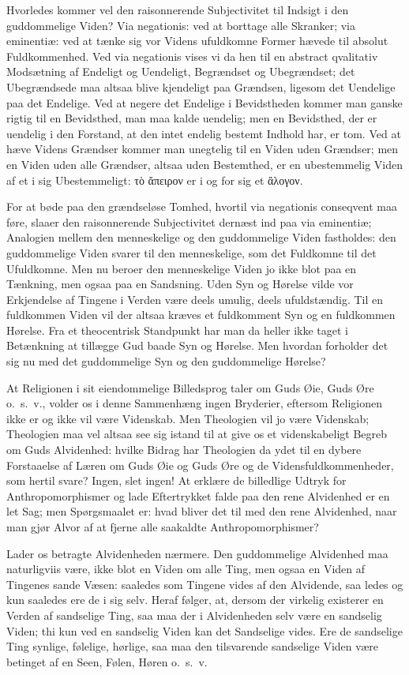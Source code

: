 \documentclass[12pt]{book}
\newcommand{\opage}[1]{\marginnote{\footnotesize\textit{[#1]}}}
\begin{document}
Hvorledes kommer vel den raisonnerende Subjectivitet til Indsigt i den
guddommelige Viden? Via negationis: ved at borttage alle Skranker; via eminentiæ:
ved at tænke sig vor Videns ufuldkomne Former hævede til absolut Fuldkommenhed.
Ved via negationis vises vi da hen til en abstract qvalitativ Modsætning af
Endeligt og Uendeligt, Begrændset og Ubegrændset; det Ubegrændsede maa altsaa
blive kjendeligt paa Grændsen, ligesom det Uendelige paa det Endelige. Ved at
negere det Endelige i Bevidstheden kommer man ganske rigtig til en Bevidsthed,
man maa kalde uendelig; men en Bevidsthed, der er uendelig i den Forstand, at den
intet endelig bestemt Indhold har, er tom. Ved at hæve Videns Grændser kommer man
unegtelig til en Viden uden Grændser; men en Viden uden alle Grændser, altsaa
uden Bestemthed,
\opage{44} er en ubestemmelig Viden af et i sig Ubestemmeligt: τὸ ἄπειρον er i og for sig et
ἄλογον.

For at bøde paa den grændseløse Tomhed, hvortil via negationis conseqvent maa
føre, slaaer den raisonnerende Subjectivitet dernæst ind paa via eminentiæ;
Analogien mellem den menneskelige og den guddommelige Viden fastholdes: den
guddommelige Viden svarer til den menneskelige, som det Fuldkomne til det
Ufuldkomne. Men nu beroer den menneskelige Viden jo ikke blot paa en Tænkning,
men ogsaa paa en Sandsning. Uden Syn og Hørelse vilde vor Erkjendelse af Tingene
i Verden være deels umulig, deels ufuldstændig. Til en fuldkommen Viden vil der
altsaa kræves et fuldkomment Syn og en fuldkommen Hørelse. Fra et theocentrisk
Standpunkt har man da heller ikke taget i Betænkning at tillægge Gud baade Syn og
Hørelse. Men hvordan forholder det sig nu med det guddommelige Syn og den
guddommelige Hørelse?

At Religionen i sit eiendommelige Billedsprog taler om Guds Øie, Guds Øre
o.~s.~v., volder os i denne Sammenhæng ingen Bryderier, eftersom Religionen ikke
er og ikke vil være Videnskab. Men Theologien vil jo være Videnskab; Theologien
maa vel altsaa see sig istand til at give os et videnskabeligt Begreb om Guds
Alvidenhed: hvilke Bidrag har Theologien da ydet til en dybere Forstaaelse af
Læren om Guds Øie og Guds Øre og de Vidensfuldkommenheder, som hertil svare?
Ingen, slet ingen! At erklære de billedlige Udtryk for Anthropomorphismer og lade
Eftertrykket falde paa den rene Alvidenhed er en let Sag; men Spørgsmaalet er:
hvad bliver det til med den rene Alvidenhed, naar man gjør Alvor af at fjerne alle
saakaldte Anthropomorphismer?

Lader os betragte Alvidenheden nærmere. Den guddommelige Alvidenhed maa
naturligviis være, ikke blot en Viden om alle Ting, men ogsaa en Viden af
Tingenes sande Væsen: saaledes som Tingene vides af den Alvidende, saa%
\opage{45} ledes og kun saaledes ere de i sig selv. Heraf følger, at, dersom der virkelig
existerer en Verden af sandselige Ting, saa maa der i Alvidenheden selv være en
sandselig Viden; thi kun ved en sandselig Viden kan det Sandselige vides. Ere de
sandselige Ting synlige, følelige, hørlige, saa maa den tilsvarende sandselige
Viden være betinget af en Seen, Følen, Høren o.~s.~v.
\end{document}
